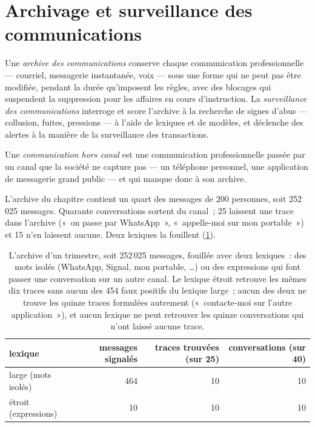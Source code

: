 \section{Archivage et surveillance des communications}

\begin{definition}\label{def:pl:surveillance-and-compliance-technology:archive}
Une \emph{archive des communications} conserve chaque communication professionnelle --- courriel, messagerie instantanée, voix --- sous une forme qui
ne peut pas être modifiée, pendant la durée qu'imposent les règles, avec des blocages qui suspendent la suppression pour les affaires en cours d'instruction.
La \emph{surveillance des communications} interroge et score l'archive à la recherche de signes d'abus --- collusion,
fuites, pressions --- à l'aide de lexiques et de modèles, et déclenche des alertes à la manière de la surveillance des transactions.
\end{definition}

\begin{definition}\label{def:pl:surveillance-and-compliance-technology:offchannel}
Une \emph{communication hors canal} est une communication professionnelle passée par un canal que la société ne capture pas ---
un téléphone personnel, une application de messagerie grand public --- et qui manque donc à son archive.
\end{definition}

L'archive du chapitre contient un quart des messages de 200 personnes, soit 252\,025 messages. Quarante conversations sortent du canal~; 25 laissent une trace
dans l'archive («~on passe par WhatsApp~», «~appelle-moi sur mon portable~») et 15 n'en laissent aucune.
Deux lexiques la fouillent (\cref{tab:pl:surveillance-and-compliance-technology:comms}).

\begin{table}[htbp]
\centering\small
\begin{tabular}{lrrr}
\toprule
lexique & messages signalés & traces trouvées (sur 25) & conversations (sur 40)\\
\midrule
large (mots isolés) & 464 & 10 & 10\\
étroit (expressions) & 10 & 10 & 10\\
\bottomrule
\end{tabular}
\caption{L'archive d'un trimestre, soit 252\,025 messages, fouillée avec deux lexiques~: des mots isolés (WhatsApp, Signal, mon portable, \dots) ou des expressions qui font passer une conversation sur un autre canal. Le lexique étroit retrouve les mêmes dix traces sans aucun des
454 faux positifs du lexique large~; aucun des deux ne trouve les quinze traces formulées autrement («~contacte-moi sur l'autre application~»), et
aucun lexique ne peut retrouver les quinze conversations qui n'ont laissé aucune trace.}\label{tab:pl:surveillance-and-compliance-technology:comms}
\end{table}

